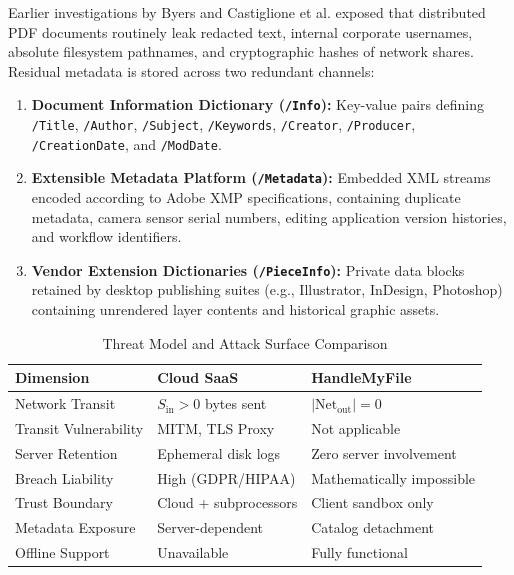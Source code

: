 \documentclass[journal]{IEEEtran}
\begin{document}
Earlier investigations by Byers \cite{byers2004information} and Castiglione et al. \cite{castiglione2010security} exposed that distributed PDF documents routinely leak redacted text, internal corporate usernames, absolute filesystem pathnames, and cryptographic hashes of network shares. Residual metadata is stored across two redundant channels:
\begin{enumerate}[leftmargin=12pt, topsep=2pt, itemsep=1pt]
\item \textbf{Document Information Dictionary (\texttt{/Info}):} Key-value pairs defining \texttt{/Title}, \texttt{/Author}, \texttt{/Subject}, \texttt{/Keywords}, \texttt{/Creator}, \texttt{/Producer}, \texttt{/CreationDate}, and \texttt{/ModDate}.
\item \textbf{Extensible Metadata Platform (\texttt{/Metadata}):} Embedded XML streams encoded according to Adobe XMP specifications, containing duplicate metadata, camera sensor serial numbers, editing application version histories, and workflow identifiers.
\item \textbf{Vendor Extension Dictionaries (\texttt{/PieceInfo}):} Private data blocks retained by desktop publishing suites (e.g., Illustrator, InDesign, Photoshop) containing unrendered layer contents and historical graphic assets.
\end{enumerate}

\begin{table}[!t]
\centering
\caption{Threat Model and Attack Surface Comparison}
\label{tab_threat_comparison}
\begin{tabular}{p{2.2cm}p{2.4cm}p{2.6cm}}
\toprule
\textbf{Dimension} & \textbf{Cloud SaaS} & \textbf{HandleMyFile} \\
\midrule
Network Transit & $S_{\text{in}} > 0$ bytes sent & $|\text{Net}_{\text{out}}| = 0$ \\
Transit Vulnerability & MITM, TLS Proxy & Not applicable \\
Server Retention & Ephemeral disk logs & Zero server involvement \\
Breach Liability & High (GDPR/HIPAA) & Mathematically impossible \\
Trust Boundary & Cloud + subprocessors & Client sandbox only \\
Metadata Exposure & Server-dependent & Catalog detachment \\
Offline Support & Unavailable & Fully functional \\
\bottomrule
\end{tabular}
\end{table}
\end{document}
